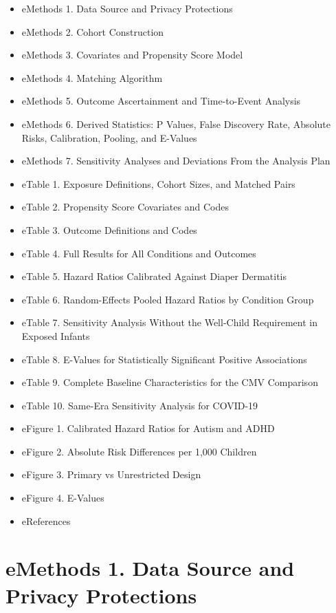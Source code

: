 \documentclass[11pt]{article}
\providecommand{\tightlist}{\setlength{\itemsep}{0pt}\setlength{\parskip}{0pt}}
\begin{document}
\begin{itemize}
\tightlist
\item
  eMethods 1. Data Source and Privacy Protections
\item
  eMethods 2. Cohort Construction
\item
  eMethods 3. Covariates and Propensity Score Model
\item
  eMethods 4. Matching Algorithm
\item
  eMethods 5. Outcome Ascertainment and Time-to-Event
  Analysis
\item
  eMethods 6. Derived Statistics: P Values, False Discovery
  Rate, Absolute Risks, Calibration, Pooling, and E-Values
\item
  eMethods 7. Sensitivity Analyses and Deviations From the
  Analysis Plan
\item
  eTable 1. Exposure Definitions, Cohort Sizes, and Matched
  Pairs
\item
  eTable 2. Propensity Score Covariates and Codes
\item
  eTable 3. Outcome Definitions and Codes
\item
  eTable 4. Full Results for All Conditions and Outcomes
\item
  eTable 5. Hazard Ratios Calibrated Against Diaper
  Dermatitis
\item
  eTable 6. Random-Effects Pooled Hazard Ratios by Condition
  Group
\item
  eTable 7. Sensitivity Analysis Without the Well-Child
  Requirement in Exposed Infants
\item
  eTable 8. E-Values for Statistically Significant Positive
  Associations
\item
  eTable 9. Complete Baseline Characteristics for the CMV
  Comparison
\item
  eTable 10. Same-Era Sensitivity Analysis for COVID-19
\item
  eFigure 1. Calibrated Hazard Ratios for Autism and ADHD
\item
  eFigure 2. Absolute Risk Differences per 1,000 Children
\item
  eFigure 3. Primary vs Unrestricted Design
\item
  eFigure 4. E-Values
\item
  eReferences
\end{itemize}

\newpage

\hypertarget{emethods-1.-data-source-and-privacy-protections}{%
\section*{eMethods 1. Data Source and Privacy
Protections}\label{emethods-1.-data-source-and-privacy-protections}}
\end{document}
